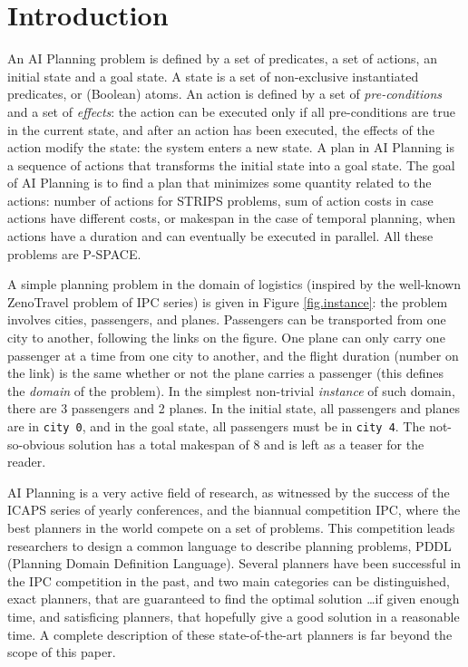 \documentclass{llncs}
\def\ZENO{{\sc ZenoTravel}}
\begin{document}
\section{Introduction}


An AI Planning problem is defined by a set of predicates, a set of actions, an initial state and a goal state. A state is a set of non-exclusive instantiated predicates, or (Boolean) atoms. An action is defined by a set of {\em pre-conditions} and a set of {\em effects}: the action can be executed only if all pre-conditions are true in the current state, and after an action has been executed, the effects of the action modify the state: the system enters a new state.
A plan in AI Planning is a sequence of actions that transforms the initial state into a  goal state. 
The goal of AI Planning is to find a plan that minimizes some quantity related to the actions: number of actions for STRIPS problems, sum of action costs in case actions have different costs, or makespan in the case of temporal planning, when actions have a duration and can eventually be executed in parallel. All these problems are P-SPACE.

A simple planning problem in the domain of logistics (inspired by the well-known {\ZENO} problem of IPC series) is given in Figure \ref{fig.instance}: the problem involves cities, passengers, and planes. Passengers can be transported from one city to another, following the links on the figure. One plane can only carry one passenger at a time from one city to another, and the flight duration (number on the link) is the same whether or not the plane carries a passenger (this defines the {\em domain} of the problem). In the simplest non-trivial {\em instance} of such domain, there are 3 passengers and 2 planes. In the initial state, all passengers and planes are in {\tt city 0}, and in the goal state, all passengers must be in {\tt city 4}. The not-so-obvious solution has a total makespan of 8 and is left as a teaser for the reader.

AI Planning is a very active field of research, as witnessed by the success of the ICAPS series of yearly conferences, and the biannual competition IPC, where the best planners in the world compete on a set of problems. This competition leads researchers to design a common language to describe planning problems, PDDL (Planning Domain Definition Language). Several planners have been successful in the IPC competition in the past, and two main categories can be distinguished, exact planners, that are guaranteed to find the optimal solution \ldots if given enough time, and satisficing planners, that hopefully give a good solution in a reasonable time. A complete description of these state-of-the-art planners is far beyond the scope of this paper. 
\end{document}
